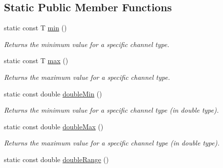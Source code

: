 \subsection*{Static Public Member Functions}
\begin{DoxyCompactItemize}
\item 
\hypertarget{struct_d_o_1_1_channel_traits_a526b7ad5d0ce589d3086127cb78ffcea}{static const T \hyperlink{struct_d_o_1_1_channel_traits_a526b7ad5d0ce589d3086127cb78ffcea}{min} ()}\label{struct_d_o_1_1_channel_traits_a526b7ad5d0ce589d3086127cb78ffcea}

\begin{DoxyCompactList}\small\item\em Returns the minimum value for a specific channel type. \end{DoxyCompactList}\item 
\hypertarget{struct_d_o_1_1_channel_traits_aef359c66c9f23cc979387e202180ddd6}{static const T \hyperlink{struct_d_o_1_1_channel_traits_aef359c66c9f23cc979387e202180ddd6}{max} ()}\label{struct_d_o_1_1_channel_traits_aef359c66c9f23cc979387e202180ddd6}

\begin{DoxyCompactList}\small\item\em Returns the maximum value for a specific channel type. \end{DoxyCompactList}\item 
\hypertarget{struct_d_o_1_1_channel_traits_a746c4925f2b1d481e2059738c7ce1c3f}{static const double \hyperlink{struct_d_o_1_1_channel_traits_a746c4925f2b1d481e2059738c7ce1c3f}{double\-Min} ()}\label{struct_d_o_1_1_channel_traits_a746c4925f2b1d481e2059738c7ce1c3f}

\begin{DoxyCompactList}\small\item\em Returns the minimum value for a specific channel type (in double type). \end{DoxyCompactList}\item 
\hypertarget{struct_d_o_1_1_channel_traits_ac72bdccc104a3cd4dae1c283f06bfc99}{static const double \hyperlink{struct_d_o_1_1_channel_traits_ac72bdccc104a3cd4dae1c283f06bfc99}{double\-Max} ()}\label{struct_d_o_1_1_channel_traits_ac72bdccc104a3cd4dae1c283f06bfc99}

\begin{DoxyCompactList}\small\item\em Returns the maximum value for a specific channel type (in double type). \end{DoxyCompactList}\item 
\hypertarget{struct_d_o_1_1_channel_traits_a2e1d5319c1eafe0514be16e626e266cf}{static const double \hyperlink{struct_d_o_1_1_channel_traits_a2e1d5319c1eafe0514be16e626e266cf}{double\-Range} ()}\label{struct_d_o_1_1_channel_traits_a2e1d5319c1eafe0514be16e626e266cf}


\end{DoxyCompactItemize}
